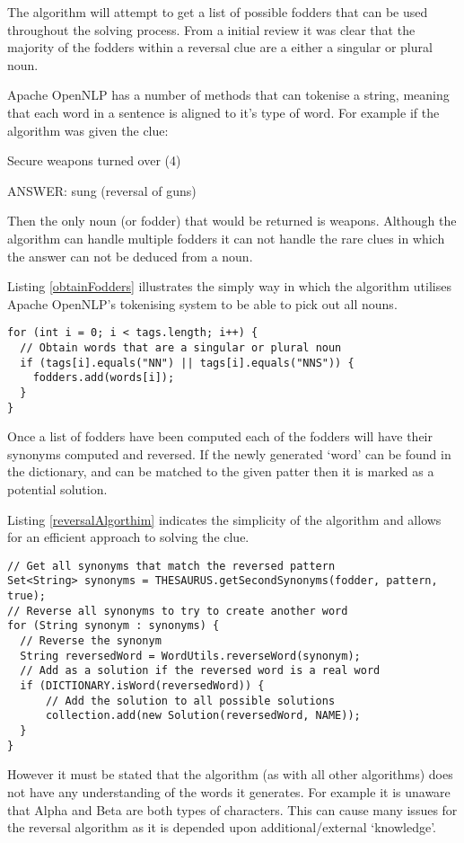 The algorithm will attempt to get a list of possible fodders that can be used 
throughout the solving process. From a initial review it was clear that the 
majority of the fodders within a reversal clue are a either a singular or plural
noun.

Apache OpenNLP has a number of methods that can tokenise a string, meaning that 
each word in a sentence is aligned to it's type of word. For example if the 
algorithm was given the clue:

Secure weapons turned over (4)

ANSWER: sung (reversal of guns)

Then the only noun (or fodder) that would be returned is weapons. Although the 
algorithm can handle multiple fodders it can not handle the rare clues in which
the answer can not be deduced from a noun.

Listing \ref{obtainFodders} illustrates the simply way in which the algorithm 
utilises Apache OpenNLP's tokenising system to be able to pick out all nouns.

\begin{lstlisting}[caption={Deducing all singular or plural nouns within the clue},
                   label=obtainFodders]  
for (int i = 0; i < tags.length; i++) {
  // Obtain words that are a singular or plural noun
  if (tags[i].equals("NN") || tags[i].equals("NNS")) {
    fodders.add(words[i]);
  }
}
\end{lstlisting}

Once a list of fodders have been computed each of the fodders will have their
synonyms computed and reversed. If the newly generated `word' can be found in 
the dictionary, and can be matched to the given patter then it is marked as a 
potential solution.

Listing \ref{reversalAlgorthim} indicates the simplicity of the algorithm and 
allows for an efficient approach to solving the clue.

\begin{lstlisting}[caption={Core reversal algorthim deducing possbile solutions},
                   label=reversalAlgorthim]  
// Get all synonyms that match the reversed pattern
Set<String> synonyms = THESAURUS.getSecondSynonyms(fodder, pattern, true);
// Reverse all synonyms to try to create another word
for (String synonym : synonyms) {
  // Reverse the synonym
  String reversedWord = WordUtils.reverseWord(synonym);
  // Add as a solution if the reversed word is a real word
  if (DICTIONARY.isWord(reversedWord)) {
      // Add the solution to all possible solutions
      collection.add(new Solution(reversedWord, NAME));
  }
}
\end{lstlisting}

However it must be stated that the algorithm (as with all other algorithms) does
not have any understanding of the words it generates. For example it is unaware
that Alpha and Beta are both types of characters. This can cause many issues for
the reversal algorithm as it is depended upon additional/external `knowledge'.
